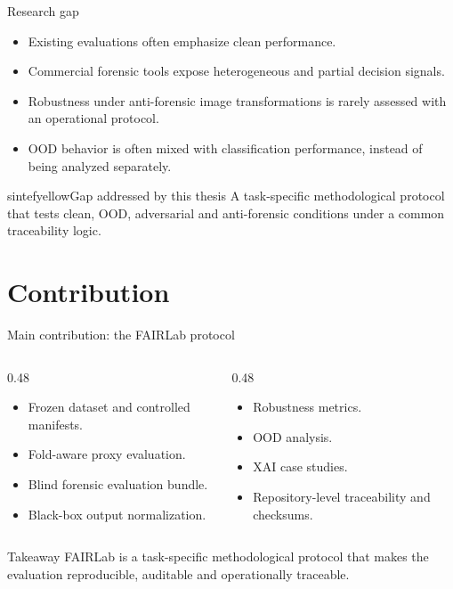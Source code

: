 \documentclass{beamer}
\begin{document}
\begin{frame}{Research gap}
\begin{itemize}
    \item Existing evaluations often emphasize clean performance.
    \item Commercial forensic tools expose heterogeneous and partial decision signals.
    \item Robustness under anti-forensic image transformations is rarely assessed with an operational protocol.
    \item OOD behavior is often mixed with classification performance, instead of being analyzed separately.
\end{itemize}

\begin{colorblock}[black]{sintefyellow}{Gap addressed by this thesis}
A task-specific methodological protocol that tests clean, OOD, adversarial and anti-forensic conditions under a common traceability logic.
\end{colorblock}
\end{frame}

\section{Contribution}

\begin{frame}{Main contribution: the FAIRLab protocol}
\begin{columns}
\begin{column}{0.48\textwidth}
\begin{itemize}
    \item Frozen dataset and controlled manifests.
    \item Fold-aware proxy evaluation.
    \item Blind forensic evaluation bundle.
    \item Black-box output normalization.
\end{itemize}
\end{column}
\begin{column}{0.48\textwidth}
\begin{itemize}
    \item Robustness metrics.
    \item OOD analysis.
    \item XAI case studies.
    \item Repository-level traceability and checksums.
\end{itemize}
\end{column}
\end{columns}

\begin{block}{Takeaway}
FAIRLab is a task-specific methodological protocol that makes the evaluation reproducible, auditable and operationally traceable.
\end{block}
\end{frame}
\end{document}
